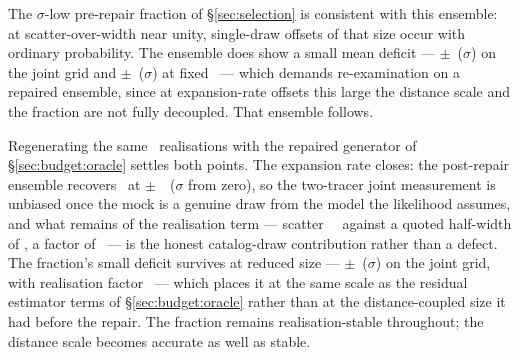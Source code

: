 The \DeepFTgtSig$\sigma$-low pre-repair fraction of \S\ref{sec:selection} is
consistent with this ensemble: at scatter-over-width near unity, single-draw
offsets of that size occur with ordinary probability. The ensemble does show a small
mean deficit --- \SdsFOffset$\pm$\SdsFSem\ (\SdsFSig$\sigma$) on the joint
grid and \SdsFscanOffset$\pm$\SdsFscanSem\ (\SdsFscanSig$\sigma$) at fixed
\Hz\ --- which demands re-examination on a repaired ensemble, since at
expansion-rate offsets this large the distance scale and the fraction are not
fully decoupled. That ensemble follows.

Regenerating the same \SdsFixN\ realisations with the repaired generator of
\S\ref{sec:budget:oracle} settles both points. The expansion rate closes: the
post-repair ensemble recovers \Hz\ at
\SdsFixHzeroOffset$\pm$\SdsFixHzeroSem~\kmsmpc\ (\SdsFixHzeroSig$\sigma$ from
zero), so the two-tracer joint measurement is unbiased once the mock is a
genuine draw from the model the likelihood assumes, and what remains of the
realisation term --- scatter \SdsFixHzeroScatter~\kmsmpc\ against a quoted
half-width of \SdsFixHzeroHw, a factor of \SdsFixHzeroFactor\ --- is the
honest catalog-draw contribution rather than a defect. The fraction's small
deficit survives at reduced size --- \SdsFixFOffset$\pm$\SdsFixFSem\
(\SdsFixFSig$\sigma$) on the joint grid, with realisation factor
\SdsFixFFactor\ --- which places it at the same scale as the residual
estimator terms of \S\ref{sec:budget:oracle} rather than at the
distance-coupled size it had before the repair. The fraction remains
realisation-stable throughout; the distance scale becomes accurate as well as
stable.
